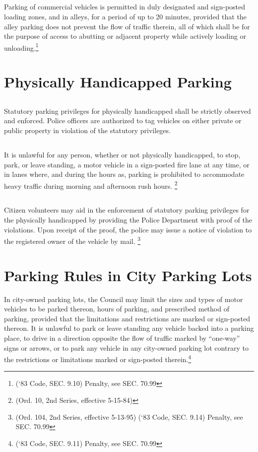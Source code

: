 \subsection{}
Parking of commercial vehicles is permitted in duly designated and sign-posted loading zones, and in alleys, for a period of up to 20 minutes, provided that the alley parking does not prevent the flow of traffic therein, all of which shall be for the purpose of access to abutting or adjacent property while actively loading or unloading.\footnote{(‘83 Code, SEC. 9.10)  Penalty, see SEC. 70.99}

\section{Physically Handicapped Parking}
\subsection{}
Statutory parking privileges for physically handicapped shall be strictly observed and enforced.  Police officers are authorized to tag vehicles on either private or public property in violation of the statutory privileges.
\subsection{}
It is unlawful for any person, whether or not physically handicapped, to stop, park, or leave standing, a motor vehicle in a sign-posted fire lane at any time, or in lanes where, and during the hours as, parking is prohibited to accommodate heavy traffic during morning and afternoon rush hours. \footnote{(Ord. 10, 2nd Series, effective 5-15-84)}
\subsection{}
Citizen volunteers may aid in the enforcement of statutory parking privileges for the physically handicapped by providing the Police Department with proof of the violations.  Upon receipt of the proof, the police may issue a notice of violation to the registered owner of the vehicle by mail. \footnote{(Ord. 104, 2nd Series, effective 5-13-95) (‘83 Code, SEC. 9.14) Penalty, see SEC. 70.99}

\section{Parking Rules in City Parking Lots}
In city-owned parking lots, the Council may limit the sizes and types of motor vehicles to be parked thereon, hours of parking, and prescribed method of parking, provided that the limitations and restrictions are marked or sign-posted thereon.  It is unlawful to park or leave standing any vehicle backed into a parking place, to drive in a direction opposite the flow of traffic marked by “one-way” signs or arrows, or to park any vehicle in any city-owned parking lot contrary to the restrictions or limitations marked or sign-posted therein.\footnote{(‘83 Code, SEC. 9.11)  Penalty, see SEC. 70.99}

